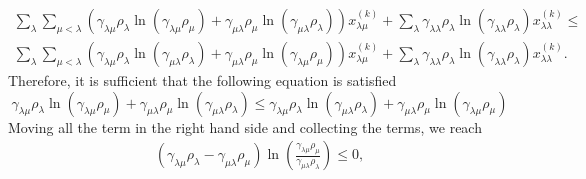 \begin{equation}
    \begin{split}
        \sum_{\lambda}\sum_{\mu<\lambda}\left(\gamma_{\lambda\mu}\rho_\lambda\ln\left(\gamma_{\lambda\mu}\rho_\mu\right) + \gamma_{\mu\lambda}\rho_\mu\ln\left(\gamma_{\mu\lambda}\rho_\lambda\right) \right) x^{(k)}_{\lambda\mu} +\sum_\lambda \gamma_{\lambda\lambda}\rho_\lambda\ln\left(\gamma_{\lambda\lambda}\rho_\lambda\right) x^{(k)}_{\lambda\lambda} \leq\\ 
        \sum_{\lambda}\sum_{\mu<\lambda}\left(\gamma_{\lambda\mu}\rho_\lambda\ln\left(\gamma_{\mu\lambda}\rho_\lambda\right)+ \gamma_{\mu\lambda}\rho_\mu\ln\left(\gamma_{\lambda\mu}\rho_\mu\right)\right)x^{(k)}_{\lambda\mu} + \sum_{\lambda}\gamma_{\lambda\lambda}\rho_\lambda\ln\left(\gamma_{\lambda\lambda}\rho_\lambda\right) x_{\lambda\lambda}^{(k)} .
    \end{split}
\end{equation}
Therefore, it is sufficient that the following equation is satisfied
\begin{equation}
    \gamma_{\lambda\mu}\rho_\lambda\ln\left(\gamma_{\lambda\mu}\rho_\mu\right) + \gamma_{\mu\lambda}\rho_\mu\ln\left(\gamma_{\mu\lambda}\rho_\lambda\right) \leq \gamma_{\lambda\mu}\rho_\lambda\ln\left(\gamma_{\mu\lambda}\rho_\lambda\right)+ \gamma_{\mu\lambda}\rho_\mu\ln\left(\gamma_{\lambda\mu}\rho_\mu\right)
\end{equation}
Moving all the term in the right hand side and collecting the terms, we reach
\begin{equation}
    \begin{split}
        \left(\gamma_{\lambda\mu}\rho_\lambda- \gamma_{\mu\lambda}\rho_\mu\right)\ln\left(\frac{\gamma_{\lambda\mu}\rho_\mu}{\gamma_{\mu\lambda}\rho_\lambda}\right)\leq 0,
    \end{split}
\end{equation}
